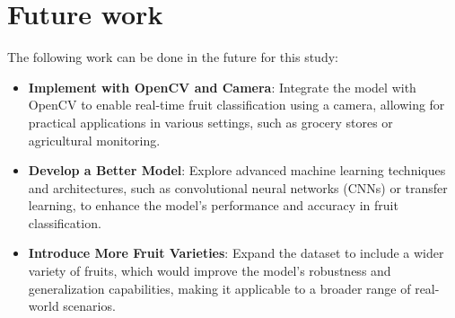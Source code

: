 \documentclass[a4paper,oneside,11pt]{book}
\begin{document}
\section{Future work}
The following work can be done in the future for this study:
\begin{itemize}
    \item \textbf{Implement with OpenCV and Camera}: Integrate the model with OpenCV to enable real-time fruit classification using a camera, allowing for practical applications in various settings, such as grocery stores or agricultural monitoring.

    \item \textbf{Develop a Better Model}: Explore advanced machine learning techniques and architectures, such as convolutional neural networks (CNNs) or transfer learning, to enhance the model's performance and accuracy in fruit classification.
    
    \item \textbf{Introduce More Fruit Varieties}: Expand the dataset to include a wider variety of fruits, which would improve the model's robustness and generalization capabilities, making it applicable to a broader range of real-world scenarios.
\end{itemize}

\end{document}
